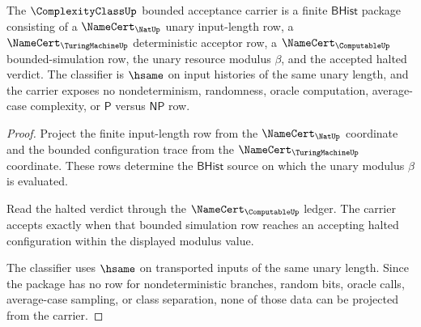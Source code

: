 \begin{theorem}
\label{thm:complexityclass-bounded-acceptance-carrier}
The $\ComplexityClassUp$ bounded acceptance carrier is a finite
$\mathsf{BHist}$ package consisting of a $\NameCert_{\NatUp}$ unary input-length
row, a $\NameCert_{\TuringMachineUp}$ deterministic acceptor row, a
$\NameCert_{\ComputableUp}$ bounded-simulation row, the unary resource modulus
$\beta$, and the accepted halted verdict. The classifier is $\hsame$ on input
histories of the same unary length, and the carrier exposes no nondeterminism,
randomness, oracle computation, average-case complexity, or $\mathsf{P}$ versus
$\mathsf{NP}$ row.
\end{theorem}
\begin{proof}
Project the finite input-length row from the $\NameCert_{\NatUp}$ coordinate
and the bounded configuration trace from the $\NameCert_{\TuringMachineUp}$
coordinate. These rows determine the $\mathsf{BHist}$ source on which the
unary modulus $\beta$ is evaluated.

Read the halted verdict through the $\NameCert_{\ComputableUp}$ ledger. The
carrier accepts exactly when that bounded simulation row reaches an accepting
halted configuration within the displayed modulus value.

The classifier uses $\hsame$ on transported inputs of the same unary length.
Since the package has no row for nondeterministic branches, random bits,
oracle calls, average-case sampling, or class separation, none of those data
can be projected from the carrier.
\end{proof}

